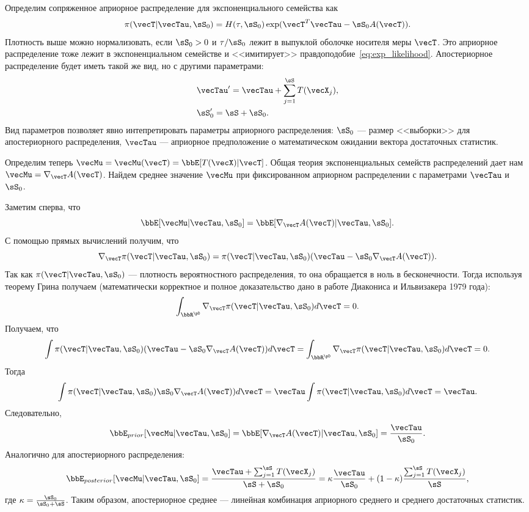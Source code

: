 Определим сопряженное априорное распределение для экспоненциального семейства как
\begin{equation}
\label{eq:prior_exponential}
\pi(\vecT | \vecTau, \sS_0) = H(\tau, \sS_0) \exp(\vecT^T \vecTau  - \sS_0 A(\vecT)).
\end{equation}
Плотность выше можно нормализовать, если $\sS_0 > 0$ и $\tau / \sS_0$ лежит в выпуклой оболочке носителя меры $\vecT$.
Это априорное распределение тоже лежит в экспоненциальном семействе и <<имитирует>> правдоподобие~\eqref{eq:exp_likelihood}.
Апостериорное распределение будет иметь такой же вид, 
но с другими параметрами:
\begin{align*}
&\vecTau' = \vecTau + \sum_{j = 1}^\sS T(\vecX_j), \\
&\sS'_0 = \sS + \sS_0.
\end{align*}
Вид параметров позволяет явно интепретировать параметры априорного распределения: $\sS_0$ --- размер <<выборки>> для апостериорного распределения, $\vecTau$ --- априорное предположение о математическом ожидании вектора достаточных статистик.



Определим теперь $\vecMu = \vecMu(\vecT) = \bbE [T(\vecX) | \vecT]$.
Общая теория экспоненциальных семейств распределений 
дает нам $\vecMu = \nabla_{\vecT} A(\vecT)$.
Найдем среднее значение $\vecMu$ при фиксированном априорном распределении с параметрами $\vecTau$ и $\sS_0$.

Заметим сперва, что 
\[
\bbE [\vecMu | \vecTau, \sS_0] = \bbE [\nabla_{\vecT} A(\vecT) | \vecTau, \sS_0].
\]
С помощью прямых вычислений получим, что
\[
\nabla_{\vecT} \pi(\vecT| \vecTau, \sS_0) = \pi(\vecT| \vecTau, \sS_0) (\vecTau - \sS_0 \nabla_{\vecT} A(\vecT)).
\]
Так как $\pi(\vecT| \vecTau, \sS_0)$ --- плотность вероятностного распределения, то она обращается в ноль в бесконечности.
Тогда используя теорему Грина получаем (математически корректное и полное доказательство дано в работе Диакониса и Ильвизакера 1979 года): %
\[
\int_{\bbR^\pD} \nabla_{\vecT} \pi(\vecT| \vecTau, \sS_0) d\vecT = 0.
\]
Получаем, что
\[
\int \pi(\vecT| \vecTau, \sS_0) (\vecTau - \sS_0 \nabla_{\vecT} A(\vecT)) d\vecT =
\int_{\bbR^\pD} \nabla_{\vecT} \pi(\vecT| \vecTau, \sS_0) d\vecT = 0.
\]
Тогда 
\[
\int \pi(\vecT| \vecTau, \sS_0) \sS_0 \nabla_{\vecT} A(\vecT)) d\vecT = \vecTau \int \pi(\vecT| \vecTau, \sS_0) d\vecT = \vecTau.
\]
Следовательно, 
\[
\bbE_{prior} [\vecMu | \vecTau, \sS_0] = \bbE [\nabla_{\vecT} A(\vecT) | \vecTau, \sS_0] = \frac{\vecTau}{\sS_0}.
\]
Аналогично для апостериорного распределения:
\[
\bbE_{posterior} [\vecMu | \vecTau, \sS_0] = \frac{\vecTau + \sum_{j = 1}^\sS T(\vecX_j)}{\sS + \sS_0} = \kappa \frac{\vecTau}{\sS_0} + (1 - \kappa) \frac{\sum_{j = 1}^\sS T(\vecX_j)}{\sS},
\]
где $\kappa = \frac{\sS_0}{\sS_0 + \sS}$.
Таким образом, апостериорное среднее --- линейная комбинация априорного среднего и среднего достаточных статистик.

